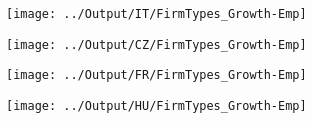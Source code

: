 \documentclass[12pt,notitlepage]{article}
\begin{document}
\begin{figure}[!htpb]
\centering
\caption{Firm types and growth in Employment}
\begin{subfigure}{.49\textwidth}
    \centering
 \texttt{[image: ../Output/IT/FirmTypes\_Growth-Emp]}
\end{subfigure}%
\begin{subfigure}{.49\textwidth}
    \centering
 \texttt{[image: ../Output/CZ/FirmTypes\_Growth-Emp]}
\end{subfigure}
\begin{subfigure}{.49\textwidth}
    \centering
 \texttt{[image: ../Output/FR/FirmTypes\_Growth-Emp]}
\end{subfigure}%
\begin{subfigure}{.49\textwidth}
    \centering
 \texttt{[image: ../Output/HU/FirmTypes\_Growth-Emp]}
\end{subfigure}
\end{figure}
\pagebreak
\end{document}
